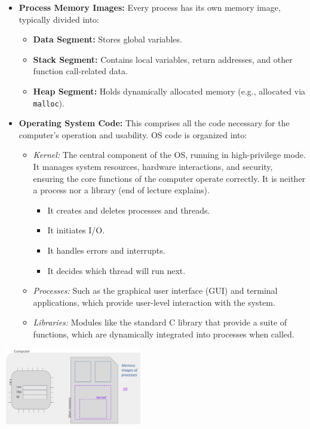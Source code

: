 \documentclass[../../compsys.tex]{subfiles}
\begin{document}
\begin{itemize}
  \item \textbf{Process Memory Images:} Every process has its own memory image, typically divided into:
  \begin{itemize}
    \item \textbf{Data Segment:} Stores global variables.
    \item \textbf{Stack Segment:} Contains local variables, return addresses, and other function call-related data.
    \item \textbf{Heap Segment:} Holds dynamically allocated memory (e.g., allocated via \texttt{malloc}).
  \end{itemize}
  \vspace{5px} 
  \item \textbf{Operating System Code:} This comprises all the code necessary for the computer's operation and usability. OS code is organized into:
    \begin{itemize}
      \item \emph{Kernel:} The central component of the OS, running in high-privilege mode. It manages system resources, hardware interactions, and security, ensuring the core functions of the computer operate correctly. It is neither a process nor a library (end of lecture explains).
        \begin{itemize}
          \item It creates and deletes processes and threads.
          \item It initiates I/O.
          \item It handles errors and interrupts.
          \item It decides which thread will run next.
        \end{itemize}
      \item \emph{Processes:} Such as the graphical user interface (GUI) and terminal applications, which provide user-level interaction with the system.
      \item \emph{Libraries:} Modules like the standard C library that provide a suite of functions, which are dynamically integrated into processes when called.
    \end{itemize}
\end{itemize}

\begin{center}
  \includegraphics[width=0.45\textwidth]{chapters/L4/images/main-mem-content.png}
\end{center}
\newpage
\end{document}
